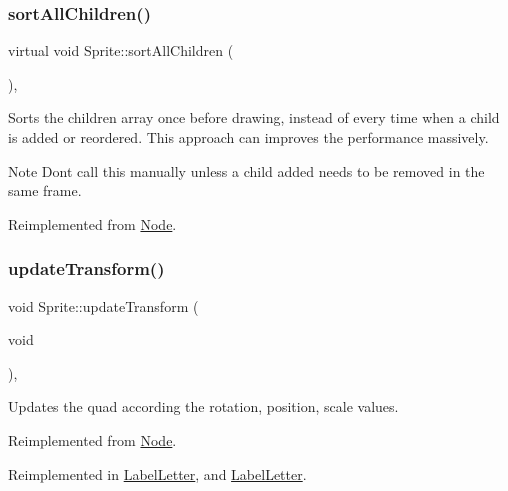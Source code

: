 \subsubsection{\texorpdfstring{sort\+All\+Children()}{sortAllChildren()}\hspace{0.1cm}{\footnotesize\ttfamily [2/2]}}
{\footnotesize\ttfamily virtual void Sprite\+::sort\+All\+Children (\begin{DoxyParamCaption}{ }\end{DoxyParamCaption})\hspace{0.3cm}{\ttfamily [override]}, {\ttfamily [virtual]}}

Sorts the children array once before drawing, instead of every time when a child is added or reordered. This approach can improves the performance massively. \begin{DoxyNote}{Note}
Don\textquotesingle{}t call this manually unless a child added needs to be removed in the same frame. 
\end{DoxyNote}


Reimplemented from \hyperlink{classNode_adfaeea03013d3eae710c4d4d725bce0b}{Node}.

\mbox{\label{classSprite_a6b64d23ba646325021c2a5118dc5163d}} 
\subsubsection{\texorpdfstring{update\+Transform()}{updateTransform()}\hspace{0.1cm}{\footnotesize\ttfamily [1/2]}}
{\footnotesize\ttfamily void Sprite\+::update\+Transform (\begin{DoxyParamCaption}\item[{void}]{ }\end{DoxyParamCaption})\hspace{0.3cm}{\ttfamily [override]}, {\ttfamily [virtual]}}

Updates the quad according the rotation, position, scale values. 

Reimplemented from \hyperlink{classNode_a8583decfa6069f06ec1e9f8080c1ae36}{Node}.



Reimplemented in \hyperlink{classLabelLetter_ae52821b1e8fb7782602524f23c23b3ac}{Label\+Letter}, and \hyperlink{classLabelLetter_ae52821b1e8fb7782602524f23c23b3ac}{Label\+Letter}.

